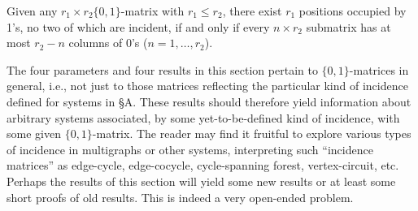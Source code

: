 Given any $r_1 \times r_2 \{0, 1\}$-matrix with $r_1 \leq r_2$, there exist $r_1$ positions occupied by 1's, no two of which are incident, if and only if every $n \times r_2$ submatrix has at most $r_2 - n$ columns of 0's ($n = 1, \ldots, r_2$).

The four parameters and four results in this section pertain to $\{0, 1\}$-matrices in general, i.e., not just to those matrices reflecting the particular kind of incidence defined for systems in §A. These results should therefore yield information about arbitrary systems associated, by some yet-to-be-defined kind of incidence, with some given $\{0, 1\}$-matrix. The reader may find it fruitful to explore various types of incidence in multigraphs or other systems, interpreting such “incidence matrices” as edge-cycle, edge-cocycle, cycle-spanning forest, vertex-circuit, etc. Perhaps the results of this section will yield some new results or at least some short proofs of old results. This is indeed a very open-ended problem.
